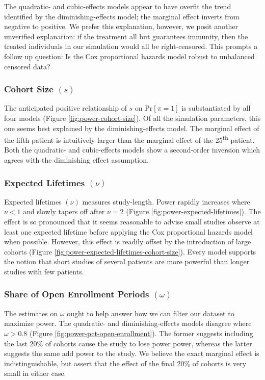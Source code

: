 
The quadratic- and cubic-effects models appear to have overfit the trend identified by the diminishing-effects model; the marginal effect inverts from negative to positive. We prefer this explanation, however, we posit another unverified explanation: if the treatment all but guarantees immunity, then the treated individuals in our simulation would all be right-censored. This prompts a follow up question: Is the Cox proportional hazards model robust to unbalanced censored data? 

\subsubsection{Cohort Size $(s)$}

The anticipated positive relationship of $s$ on $\text{Pr}[\pi = 1]$ is substantiated by all four models (Figure \ref{fig:power-cohort-size}). Of all the simulation parameters, this one seems best explained by the diminishing-effects model. The marginal effect of the fifth patient is intuitively larger than the marginal effect of the 25\textsuperscript{th} patient. Both the quadratic- and cubic-effects models show a second-order inversion which agrees with the diminishing effect assumption. 

\subsubsection{Expected Lifetimes $(\nu)$}

Expected lifetimes $(\nu)$ measures study-length. Power rapidly increases where $\nu < 1$ and slowly tapers off after $\nu = 2$ (Figure \ref{fig:power-expected-lifetimes}). The effect is so pronounced that it seems reasonable to advise small studies observe at least one expected lifetime before applying the Cox proportional hazards model when possible. However, this effect is readily offset by the introduction of large cohorts (Figure \ref{fig:power-expected-lifetimes-cohort-size}). Every model supports the notion that short studies of several patients are more powerful than longer studies with few patients. 

\subsubsection{Share of Open Enrollment Periods $(\omega)$}

The estimates on $\omega$ ought to help answer how we can filter our dataset to maximize power. The quadratic- and diminishing-effects models disagree where $\omega > 0.8$ (Figure \ref{fig:power-pct-open-enrollment}). The former suggests including the last 20\% of cohorts cause the study to lose power power, whereas the latter suggests the same add power to the study. We believe the exact marginal effect is indistinguishable, but assert that the effect of the final 20\% of cohorts is very small in either case\footnotemark.



